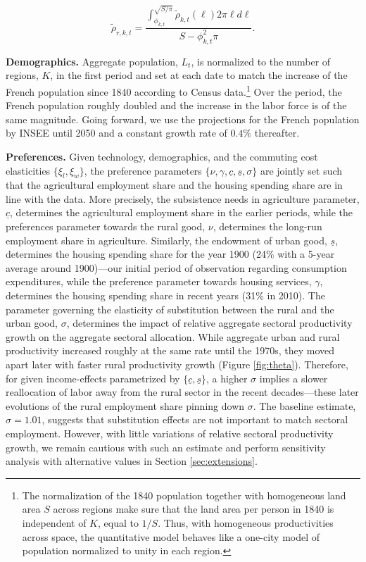 \documentclass[./20250130-paper.tex]{subfiles}
\begin{document}
\begin{equation*}
	\tilde{\rho}_{r,k,t}=\frac{\int_{\phi_{k,t}}^{\sqrt{S/\pi}} \tilde{\rho}_{k,t}(\ell)2 \pi \ell d\ell}{S - \phi_{k,t}^2 \pi}.
\end{equation*}


\textbf{Demographics.} Aggregate population, $L_t$, is normalized to the number of regions, $K$, in the first period and set at each date to match the increase of the French population since 1840 according to Census data.\footnote{The normalization of the 1840 population together with homogeneous land area $S$ across regions make sure that the land area per person in 1840 is independent of $K$, equal to $1/S$. Thus, with homogeneous productivities across space, the quantitative model behaves like a one-city model of population normalized to unity in each region.} Over the period, the French population roughly doubled and the increase in the labor force is of the same magnitude. Going forward, we use the projections for the French population by INSEE until 2050 and a constant growth rate of $0.4\%$ thereafter.

\textbf{Preferences.} Given technology, demographics, and the commuting cost elasticities $\{\xi_l,\xi_w\}$, the preference parameters $\{\nu, \gamma, \underline{c}, \underline{s}, \sigma\}$ are jointly set such that the agricultural employment share and the housing spending share are in line with the data. More precisely, the subsistence needs in agriculture parameter, $\underline{c}$, determines the agricultural employment share in the earlier periods, while the preferences parameter towards the rural good, $\nu$, determines the long-run employment share in agriculture. Similarly, the endowment of urban good, $\underline{s}$, determines the housing spending share for the year 1900 (24\% with a 5-year average around 1900)---our initial period of observation regarding consumption expenditures, while the preference parameter towards housing services, $\gamma$, determines the housing spending share in recent years (31\% in 2010). The parameter governing the elasticity of substitution between the rural and the urban good, $\sigma$, determines the impact of relative aggregate sectoral productivity growth on the aggregate sectoral allocation. While aggregate urban and rural productivity increased roughly at the same rate until the 1970s, they moved apart later with faster rural productivity growth (Figure \ref{fig:theta}). Therefore, for given income-effects parametrized by $\{\underline{c}, \underline{s}\}$, a higher $\sigma$ implies a slower reallocation of labor away from the rural sector in the recent decades---these later evolutions of the rural employment share pinning down $\sigma$. The baseline estimate, $\sigma=1.01$, suggests that substitution effects are not important to match sectoral employment. However, with little variations of relative sectoral productivity growth, we remain cautious with such an estimate and perform sensitivity analysis with alternative values in Section \ref{sec:extensions}. 
\end{document}
